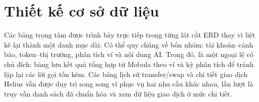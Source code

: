 \section{Thiết kế cơ sở dữ liệu}
\label{sec:thiet_ke_csdl}






Các bảng trọng tâm được trình bày trực tiếp trong từng lát cắt ERD thay vì liệt kê lại thành một danh mục dài. Có thể quy chúng về bốn nhóm: tài khoản--cảnh báo, token--thị trường, phân tích ví và nội dung AI. Trong đó,  là một ngoại lệ có chủ đích: bảng lưu kết quả tổng hợp từ Mobula theo ví và kỳ phân tích để tránh lặp lại các lời gọi tốn kém. Các bảng lịch sử transfer/swap và chi tiết giao dịch Helius vẫn được duy trì song song vì phục vụ hai nhu cầu khác nhau, lần lượt là truy vấn danh sách đã chuẩn hóa và xem dữ liệu giao dịch ở mức chi tiết.
